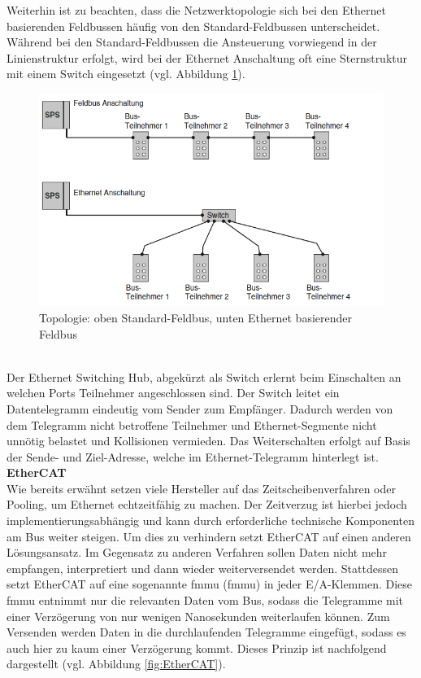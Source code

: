 \documentclass[ a4paper,
                oneside,
                toc=bibliography,
                toc=listof
                ]{scrbook}
\begin{document}
	Weiterhin ist zu beachten, dass die Netzwerktopologie sich bei den Ethernet basierenden Feldbussen häufig von den Standard-Feldbussen unterscheidet. Während bei den Standard-Feldbussen die Ansteuerung vorwiegend in der Linienstruktur erfolgt, wird bei der Ethernet Anschaltung oft eine Sternstruktur mit einem Switch eingesetzt (vgl. Abbildung \ref{fig:TopologieEthernet}).
	\begin{figure}[!ht]
		\centering
		\includegraphics[width=1.0\linewidth]{./images/Feldbus vs Ethernet Anschaltung.png}
		\caption{Topologie: oben Standard-Feldbus, unten Ethernet basierender Feldbus \cite{hering2012elektrotechnik}}
		\label{fig:TopologieEthernet}
	\end{figure}\\
	Der Ethernet Switching Hub, abgekürzt als Switch erlernt beim Einschalten an welchen Ports Teilnehmer angeschlossen sind. Der Switch leitet ein Datentelegramm eindeutig vom Sender zum Empfänger. Dadurch werden von dem Telegramm nicht betroffene Teilnehmer und Ethernet-Segmente nicht unnötig belastet und Kollisionen vermieden. Das Weiterschalten erfolgt auf Basis der Sende- und Ziel-Adresse, welche im Ethernet-Telegramm hinterlegt ist. \cite{hering2012elektrotechnik} \\
	\textbf{EtherCAT} \\
	Wie bereits erwähnt setzen viele Hersteller auf das Zeitscheibenverfahren oder Pooling, um Ethernet echtzeitfähig zu machen. Der Zeitverzug ist hierbei jedoch implementierungsabhängig und kann durch erforderliche technische Komponenten am Bus weiter steigen. Um dies zu verhindern setzt EtherCAT auf einen anderen Lösungsansatz. Im Gegensatz zu anderen Verfahren sollen Daten nicht mehr empfangen, interpretiert und dann wieder weiterversendet werden. Stattdessen setzt EtherCAT auf eine sogenannte \acs{fmmu} (\acl{fmmu}) in jeder E/A-Klemmen. Diese \acs{fmmu} entnimmt nur die relevanten Daten vom Bus, sodass die Telegramme mit einer Verzögerung von nur wenigen Nanosekunden weiterlaufen können. Zum Versenden werden Daten in die durchlaufenden Telegramme eingefügt, sodass es auch hier zu kaum einer Verzögerung kommt. Dieses Prinzip ist nachfolgend dargestellt (vgl. Abbildung \ref{fig:EtherCAT}).
\end{document}

